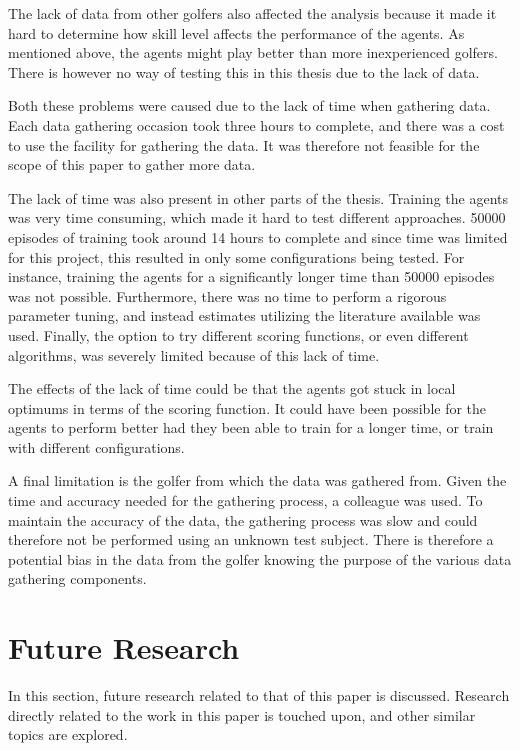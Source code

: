 \documentclass{kththesis}
\begin{document}
The lack of data from other golfers also affected the analysis because it made it hard to determine how skill level affects the performance of the agents. As mentioned above, the agents might play better than more inexperienced golfers. There is however no way of testing this in this thesis due to the lack of data. 

Both these problems were caused due to the lack of time when gathering data. Each data gathering occasion took three hours to complete, and there was a cost to use the facility for gathering the data. It was therefore not feasible for the scope of this paper to gather more data.

The lack of time was also present in other parts of the thesis. Training the agents was very time consuming, which made it hard to test different approaches. 50000 episodes of training took around 14 hours to complete and since time was limited for this project, this resulted in only some configurations being tested. For instance, training the agents for a significantly longer time than 50000 episodes was not possible. Furthermore, there was no time to perform a rigorous parameter tuning, and instead estimates utilizing the literature available was used. Finally, the option to try different scoring functions, or even different algorithms, was severely limited because of this lack of time.

The effects of the lack of time could be that the agents got stuck in local optimums in terms of the scoring function. It could have been possible for the agents to perform better had they been able to train for a longer time, or train with different configurations. 

A final limitation is the golfer from which the data was gathered from. Given the time and accuracy needed for the gathering process, a colleague was used. To maintain the accuracy of the data, the gathering process was slow and could therefore not be performed using an unknown test subject. There is therefore a potential bias in the data from the golfer knowing the purpose of the various data gathering components. 

\section{Future Research}
In this section, future research related to that of this paper is discussed. Research directly related to the work in this paper is touched upon, and other similar topics are explored.
\end{document}
